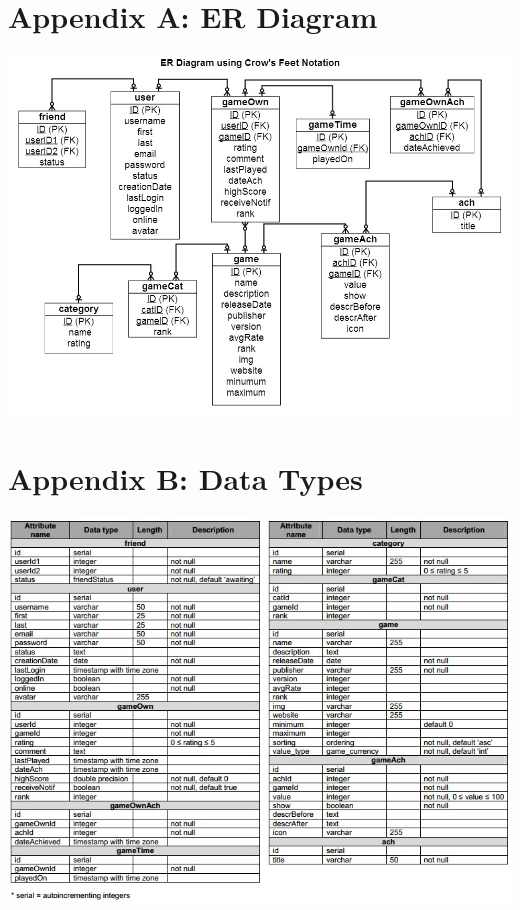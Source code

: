 \documentclass{article}
\begin{document}
\chapter{\textbf{Appendix A: ER Diagram}}
\begin{center}
\includegraphics[width=0.90\columnwidth]{er} %
\end{center}
\newpage
\chapter{\textbf{Appendix B: Data Types}}
\begin{center}
\includegraphics[width=0.95\columnwidth]{types} %
\end{center}

\vspace{40pt}
\end{document}
